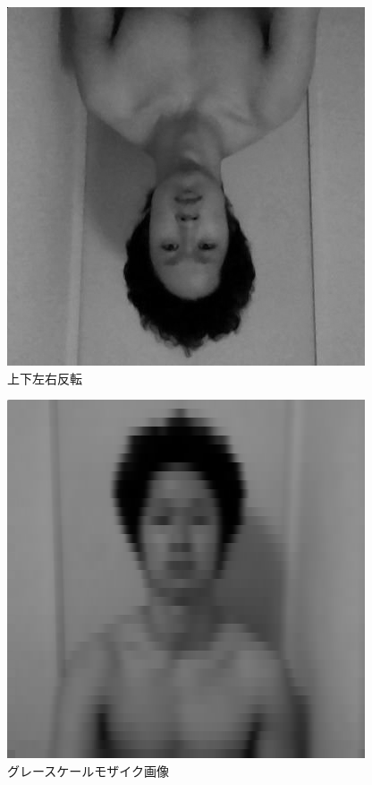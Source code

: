 \documentclass[10pt,a4paper]{jsarticle}
\begin{document}
\begin{figure}[h]
  \includegraphics[scale=1]{sutehagereverse.png}
  \caption{上下左右反転}
  \label{fig:sutehage}
  
\end{figure}

\begin{figure}[h]
  \includegraphics[scale=1]{sutehagemosaic.png}
  \caption{グレースケールモザイク画像}
  \label{fig:sutehage}
  
\end{figure}
\end{document}
